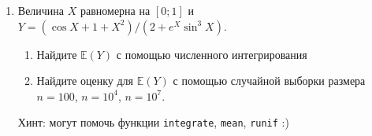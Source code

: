 \documentclass[10pt,a4paper]{article}
\newcommand{\E}{\mathbb{E}}
\begin{document}
\pagestyle{fancy}

\fancyhf{}


\begin{enumerate}
\item Величина $X$ равномерна на $[0;1]$ и  $Y=(\cos X + 1+ X^2)/(2+e^X \sin^3 X)$. 
\begin{enumerate}
\item Найдите $\E(Y)$ с помощью численного интегрирования
\item Найдите оценку для $\E(Y)$ с помощью случайной выборки размера $n=100$, $n=10^4$, $n=10^7$.
\end{enumerate}

Хинт: могут помочь функции \verb|integrate|, \verb|mean|, \verb|runif| :)
\end{enumerate}
\end{document}
